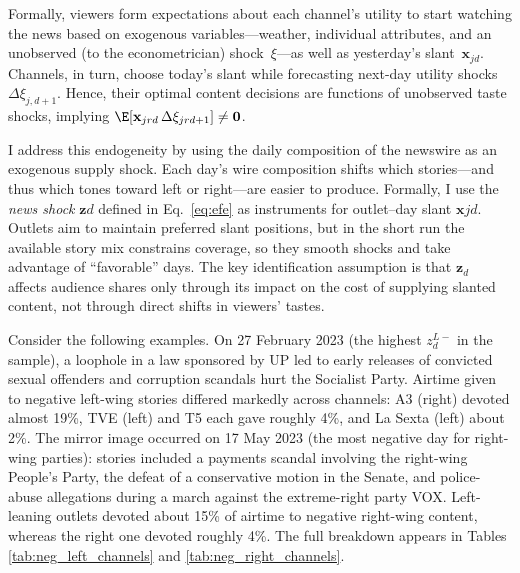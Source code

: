 \documentclass[12pt]{article}
\begin{document}
	
	Formally, viewers form expectations about each channel’s utility to start watching the news based on exogenous variables—weather, individual attributes, and an unobserved (to the econometrician) shock~$\xi$—as well as yesterday’s  slant~$\bm{x}_{jd}$. Channels, in turn, choose today’s slant while forecasting next-day utility shocks~$\Delta\xi_{j,d+1}$. Hence, their optimal content decisions are functions of unobserved taste shocks, implying $\E[\mathbf{x}_{jrd}\,\Delta\xi_{jrd+1}] \neq \mathbf{0}$.
	
	
I address this endogeneity by using the daily composition of the newswire as an exogenous supply shock. Each day’s wire composition shifts which stories—and thus which tones toward left or right—are easier to produce. Formally, I use the \emph{news shock} $\mathbf{z}d$ defined in Eq.~\ref{eq:efe} as instruments for outlet–day slant $\mathbf{x}{jd}$. Outlets aim to maintain preferred slant positions, but in the short run the available story mix constrains coverage, so they smooth shocks and take advantage of “favorable” days. The key identification assumption is that $\mathbf{z}_d$ affects audience shares only through its impact on the cost of supplying slanted content, not through direct shifts in viewers’ tastes.
	
	
	
Consider the following examples. On {27 February 2023} (the highest $z_d^{L-}$ in the sample), a loophole in a law sponsored by UP led to early releases of convicted sexual offenders and corruption scandals hurt the Socialist Party. Airtime given to negative left-wing stories differed markedly across channels: A3 (right) devoted almost 19\%, TVE (left) and T5 each gave roughly 4\%, and La Sexta (left) about 2\%. The mirror image occurred on {17 May 2023} (the most negative day for right-wing parties): stories included a payments scandal involving the right-wing People’s Party, the defeat of a conservative motion in the Senate, and police-abuse allegations during a march against the extreme-right party VOX. Left-leaning outlets devoted about 15\% of airtime to negative right-wing content, whereas the right one devoted roughly 4\%. The full breakdown appears in Tables \ref{tab:neg_left_channels} and \ref{tab:neg_right_channels}.

	
	
\end{document}
